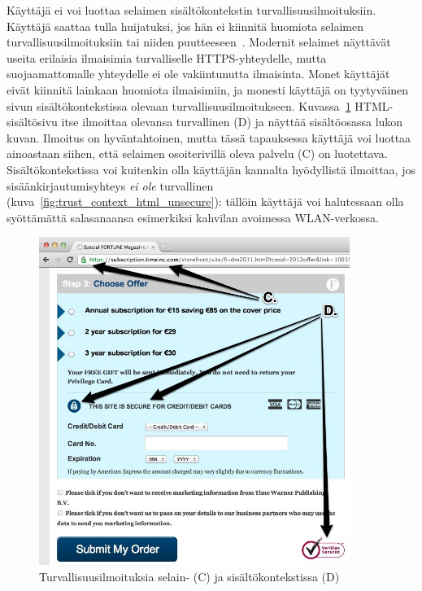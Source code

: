 \documentclass[finnish,gradu]{tktltiki}
\begin{document}
  Käyttäjä ei voi luottaa selaimen sisältökontekstin turvallisuusilmoituksiin. Käyttäjä saattaa tulla huijatuksi, jos hän ei kiinnitä huomiota selaimen turvallisuusilmoituksiin tai niiden puutteeseen~\cite{why_phishing_works_06}. Modernit selaimet näyttävät useita erilaisia ilmaisimia turvalliselle HTTPS-yhteydelle, mutta suojaamattomalle yhteydelle ei ole vakiintunutta ilmaisinta. Monet käyttäjät eivät kiinnitä lainkaan huomiota ilmaisimiin, ja monesti käyttäjä on tyytyväinen sivun sisältökontekstissa olevaan turvallisuusilmoitukseen. Kuvassa~\ref{fig:trust_context_html} HTML-sisältösivu itse ilmoittaa olevansa turvallinen (D) ja näyttää sisältöosassa lukon kuvan. Ilmoitus on hyväntahtoinen, mutta tässä tapauksessa käyttäjä voi luottaa ainoastaan siihen, että selaimen osoiterivillä oleva palvelu (C) on luotettava. Sisältökontekstissa voi kuitenkin olla käyttäjän kannalta hyödyllistä ilmoittaa, jos sisäänkirjautumisyhteys \emph{ei ole} turvallinen (kuva~\ref{fig:trust_context_html_unsecure}): tällöin käyttäjä voi halutessaan olla syöttämättä salasanaansa esimerkiksi kahvilan avoimessa WLAN-verkossa.

  \begin{figure}
    \centering
    \includegraphics[width=0.9\textwidth]{images/trust_context_html.jpg}
    \caption{Turvallisuusilmoituksia selain- (C) ja sisältökontekstissa (D)}
    \label{fig:trust_context_html}
  \end{figure}
\end{document}

